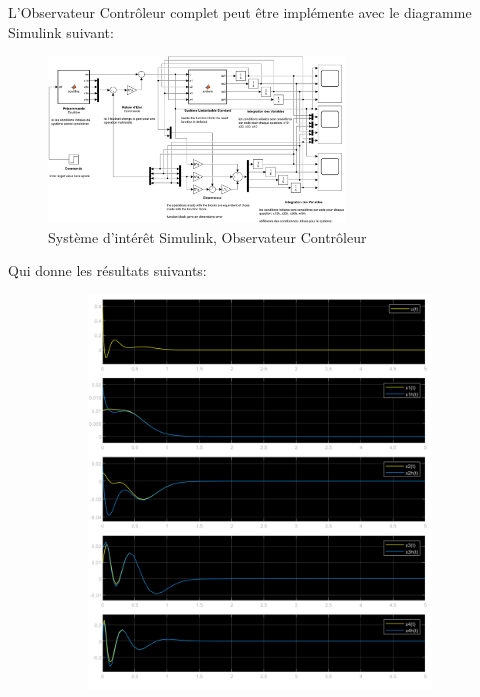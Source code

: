 \documentclass[class=article, crop=false]{standalone}
\begin{document}
\begin{resolution}
    L'Observateur Contrôleur complet peut être implémente avec le diagramme Simulink suivant:
    \begin{figure}[H]
        \centering
        \includegraphics[width=0.7\textwidth]{../images/system_simulink_5.png}
        \caption{Système d'intérêt Simulink, Observateur Contrôleur}
    \end{figure}
    Qui donne les résultats suivants:
    \begin{figure}[H]
        \centering
        \begin{subfigure}[b]{0.45\textwidth}
            \centering
            \includegraphics[width=\textwidth]{../images/m5_r0_s0.01_o0.02.png}

\end{subfigure}
\end{figure}
\end{resolution}
\end{document}
